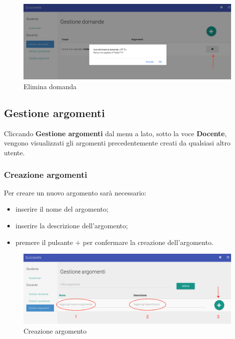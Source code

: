 \documentclass[12pt,a4paper]{article}
\begin{document}
	\begin{figure}[H]	
		\centering
		\includegraphics[width=1.0\linewidth]{../img/screenshot/eliminaDomanda.png}
		\caption{Elimina domanda}
		\label{Elimina domanda}
	\end{figure}
		
	\subsection{Gestione argomenti}
	\par Cliccando \textbf{Gestione argomenti} dal menu a lato, sotto la voce \textbf{Docente}, vengono visualizzati gli argomenti precedentemente creati da qualsiasi altro utente.
	
		\subsubsection{Creazione argomenti}

		\par Per creare un nuovo argomento sarà necessario:
		\begin{itemize}
			\item inserire il nome del argomento;
			\item inserire la descrizione dell'argomento;
			\item premere il pulsante $\boldsymbol{+}$ per confermare la creazione dell'argomento.
		\end{itemize}
		
			\begin{figure}[H]	
				\centering
				\includegraphics[width=1.0\linewidth]{../img/screenshot/aggiungiArgomento.png}
				\caption{Creazione argomento}
				\label{Creazione argomento}
			\end{figure}
		
\end{document}

